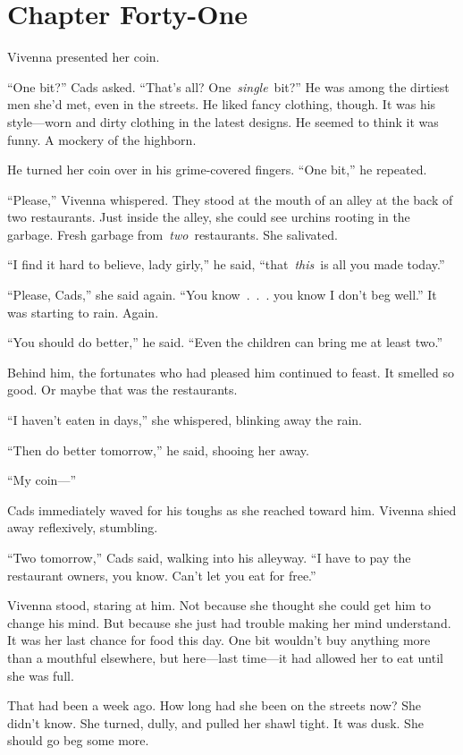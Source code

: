 \section{Chapter Forty-One}

Vivenna presented her coin.

“One bit?” Cads asked. “That’s all? One~\textit{single}~bit?” He was among the dirtiest men she’d met, even in the streets. He liked fancy clothing, though. It was his style—worn and dirty clothing in the latest designs. He seemed to think it was funny. A mockery of the highborn.

He turned her coin over in his grime-covered fingers. “One bit,” he repeated.

“Please,” Vivenna whispered. They stood at the mouth of an alley at the back of two restaurants. Just inside the alley, she could see urchins rooting in the garbage. Fresh garbage from~\textit{two}~restaurants. She salivated.

“I find it hard to believe, lady girly,” he said, “that~\textit{this}~is all you made today.”

“Please, Cads,” she said again. “You know~.~.~. you know I don’t beg well.” It was starting to rain. Again.

“You should do better,” he said. “Even the children can bring me at least two.”

Behind him, the fortunates who had pleased him continued to feast. It smelled so good. Or maybe that was the restaurants.

“I haven’t eaten in days,” she whispered, blinking away the rain.

“Then do better tomorrow,” he said, shooing her away.

“My coin—”

Cads immediately waved for his toughs as she reached toward him. Vivenna shied away reflexively, stumbling.

“Two tomorrow,” Cads said, walking into his alleyway. “I have to pay the restaurant owners, you know. Can’t let you eat for free.”

Vivenna stood, staring at him. Not because she thought she could get him to change his mind. But because she just had trouble making her mind understand. It was her last chance for food this day. One bit wouldn’t buy anything more than a mouthful elsewhere, but here—last time—it had allowed her to eat until she was full.

That had been a week ago. How long had she been on the streets now? She didn’t know. She turned, dully, and pulled her shawl tight. It was dusk. She should go beg some more.

